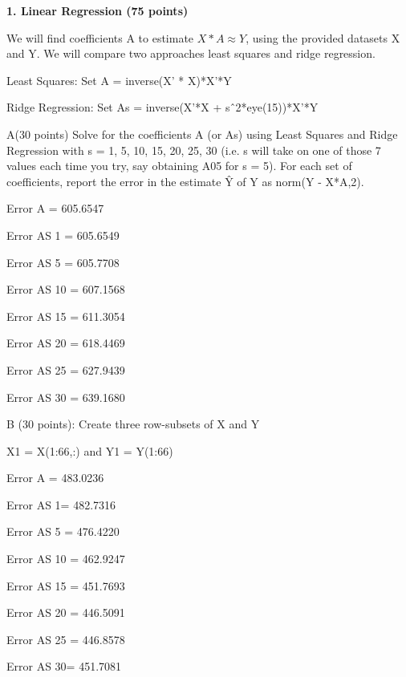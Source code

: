 \documentclass{report}
\begin{document}
 
\begin{center}
\textbf{1. Linear Regression (75 points)}
\end{center}

\begin{flushleft}
 We will find coefficients A to estimate $X*A \approx Y$, using the provided datasets X and Y. We will compare two approaches least squares and ridge regression.
 
 Least Squares: Set A = inverse(X’ * X)*X’*Y
 
 Ridge Regression: Set As = inverse(X’*X + sˆ2*eye(15))*X’*Y
\end{flushleft}

 \begin{flushleft}
A(30 points) Solve for the coefficients A (or As) using Least Squares and Ridge Regression with s = {1, 5, 10, 15, 20, 25, 30} (i.e. s will take on one of those 7 values each time you try, say obtaining A05 for s = 5). For each set of coefficients, report the error in the estimate \^{Y} of Y as norm(Y - X*A,2).
\end{flushleft}

 \begin{flushleft}
Error A = 605.6547

Error AS 1 = 605.6549

Error AS 5 = 605.7708

Error AS 10 = 607.1568

Error AS 15 = 611.3054

Error AS 20 = 618.4469

Error AS 25 = 627.9439

Error AS 30 = 639.1680
\end{flushleft}

 \begin{flushleft}
B (30 points): Create three row-subsets of X and Y
\end{flushleft}

 \begin{flushleft}
X1 = X(1:66,:) and Y1 = Y(1:66)

Error A = 483.0236

Error AS 1= 482.7316

Error AS 5 = 476.4220

Error AS 10 = 462.9247

Error AS 15 = 451.7693

Error AS 20 = 446.5091

Error AS 25 = 446.8578

Error AS 30= 451.7081
\end{flushleft}
\end{document}

